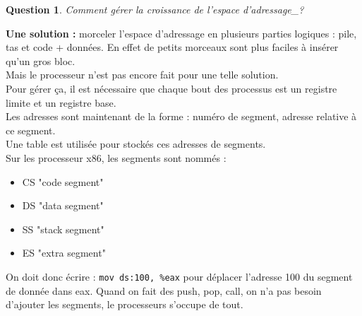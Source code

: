 \documentclass[12pt,a4paper]{report}
\newtheorem*{q}{Question}
\begin{document}
\begin{q}Comment gérer la croissance de l'espace d'adressage_?\end{q}
\textbf{Une solution :} morceler l'espace d'adressage en plusieurs parties logiques : pile, tas et code + données. En effet de petits morceaux sont plus faciles à insérer qu'un gros bloc.\\
Mais le processeur n'est pas encore fait pour une telle solution.\\
Pour gérer ça, il est nécessaire que chaque bout des processus est un registre limite et un registre base.\\

Les adresses sont maintenant de la forme : numéro de segment, adresse relative à ce segment.\\
Une table est utilisée pour stockés ces adresses de segments.\\

Sur les processeur x86, les segments sont nommés :
\begin{itemize}
\item CS "code segment"
\item DS "data segment"
\item SS "stack segment"
\item ES "extra segment"
\end{itemize} 

On doit donc écrire : \verb?mov ds:100, %eax? pour déplacer l'adresse 100 du segment de donnée dans eax. Quand on fait des push, pop, call, on n'a pas besoin d'ajouter les segments, le processeurs s'occupe de tout.

\begin{center}
\end{center}
\end{document}
